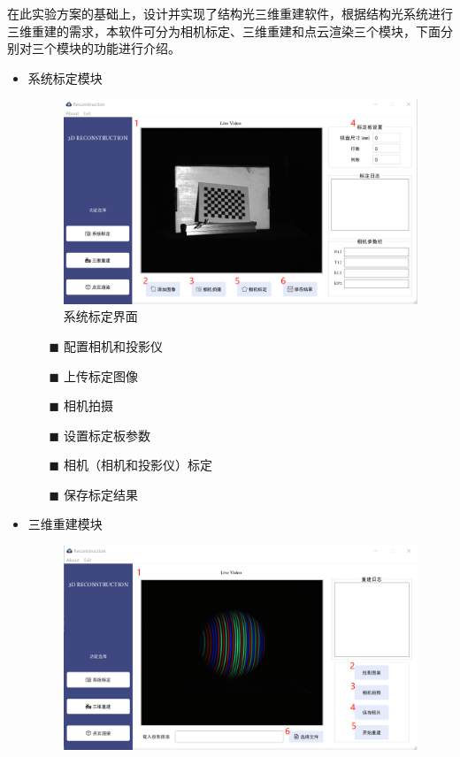 \documentclass[article]{BJTU-thesis}
\begin{document}
     在此实验方案的基础上，设计并实现了结构光三维重建软件，根据结构光系统进行三维重建的需求，本软件可分为相机标定、三维重建和点云渲染三个模块，下面分别对三个模块的功能进行介绍。
     \begin{itemize}
     	\item 系统标定模块
     	\begin{figure}[!htbp]
     		\centering
     		\includegraphics[scale=0.5]{2.png}
     		\caption{系统标定界面}
     	\end{figure}
     \begin{itemize}
     	\item[$\blacksquare$] 配置相机和投影仪
        \item[$\blacksquare$] 上传标定图像
     	\item[$\blacksquare$] 相机拍摄
     	\item[$\blacksquare$] 设置标定板参数
     	\item[$\blacksquare$] 相机（相机和投影仪）标定
     	\item[$\blacksquare$] 保存标定结果
     \end{itemize}
 \newpage
     \item 三维重建模块
     \begin{figure}[!htbp]
     	\centering
     	\includegraphics[scale=0.6]{3.png}

\end{figure}
\end{itemize}
\end{document}
